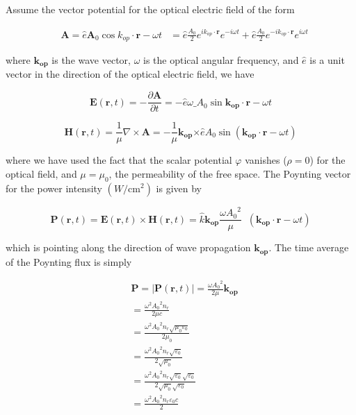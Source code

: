 Assume the vector potential for the optical electric field of the form

\begin{eqnarray}
  & \bm{A} = \hat{e}\bm{A}_0\cos{k_{op}\cdot\bm{r}-\omega{t}}
  & = \hat{e}\frac{A_0}{2}e^{ik_{op}\cdot\bm{r}}e^{-i\omega{t}} + \hat{e}\frac{A_0}{2}e^{-ik_{op}\cdot\bm{r}}e^{i\omega{t}}
\end{eqnarray}

where $\bm{k_{op}}$ is the wave vector, $\omega$ is the optical angular frequency, and $\hat{e}$ is a unit vector in the direction of the optical electric field, we have

\begin{equation}
  \bm{E}(\bm{r},t) = -\frac{\partial\bm{A}}{\partial{t}}= -\hat{e}\omega{\bm_{A}}_0\sin{\bm{k_{op}}\cdot\bm{r}-\omega{t}}
\end{equation}

\begin{equation}
  \bm{H}\left( \bm{r,}t \right) = \frac{1}{\mu}\nabla \times \bm{A} = - \frac{1}{\mu}\bm{k_{\bm{\text{op}}}}\bm{\times}\hat{e}A_{0}\sin\left( \bm{k}_{\bm{\text{op}}} \cdot \bm{r} - \omega t \right)
\end{equation}

where we have used the fact that the scalar potential \(\varphi\)
vanishes (\(\rho = 0\)) for the optical field, and \(\mu = \mu_{0}\), the
permeability of the free space. The Poynting vector for the power
intensity \((W/\text{cm}^{2})\) is given by

\begin{equation}
  \bm{P}\left( \bm{r,}t \right) = \bm{E}\left( \bm{r,}t \right) \times \bm{H}\left( \bm{r,}t \right) = \hat{k}\bm{k}_{\bm{\text{op}}}\frac{\omega{A_{0}}^{2}}{\mu}\operatorname{}\left( \bm{k}_{\bm{\text{op}}} \cdot \bm{r} - \omega t \right)
\end{equation}

which is pointing along the direction of wave propagation
\(\bm{k}_{\bm{\text{op}}}\). The time average of the Poynting
flux is simply

\begin{eqnarray}
& \bm{P} = \left| \bm{P}\left( \bm{r,}t \right) \right| = \frac{\omega{A_{0}}^{2}}{2\mu}\bm{k}_{\bm{\text{op}}} \nonumber \\
& = \frac{\omega^{2}{A_{0}}^{2}n_{r}}{2\mu{c}} \nonumber \\
& = \frac{\omega^{2}{A_{0}}^{2}n_{r}\sqrt{\mu_{0}\varepsilon_{0}}}{2\mu_{0}} \nonumber \\
& = \frac{\omega^{2}{A_{0}}^{2}n_{r}\sqrt{\varepsilon_{0}}}{2\sqrt{\mu_{0}}} \nonumber \\
& = \frac{\omega^{2}{A_{0}}^{2}n_{r}\sqrt{\varepsilon_{0}}\sqrt{\varepsilon_{0}}}{2\sqrt{\mu_{0}}\sqrt{\varepsilon_{0}}} \nonumber \\
& = \frac{\omega^{2}{A_{0}}^{2}n_{r}\varepsilon_{0}c}{2}
\end{eqnarray}

